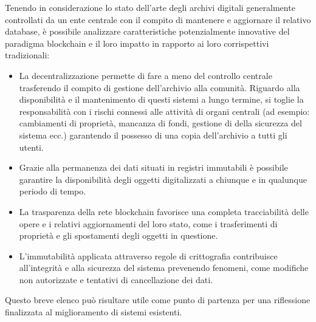 Tenendo in considerazione lo stato dell'arte degli archivi digitali generalmente controllati da un ente centrale con il compito di mantenere e aggiornare il relativo database, è possibile analizzare caratteristiche potenzialmente innovative del paradigma blockchain e il loro impatto in rapporto ai loro corrispettivi tradizionali:

\begin{itemize}
\item La decentralizzazione permette di fare a meno del controllo centrale trasferendo il compito di gestione dell’archivio alla comunità. Riguardo alla disponibilità e il mantenimento di questi sistemi a lungo termine, si toglie la responsabilità con i rischi connessi alle attività di organi centrali (ad esempio: cambiamenti di proprietà, mancanza di fondi, gestione di della sicurezza del sistema ecc.) garantendo il possesso di una copia dell’archivio a tutti gli utenti. 
\item Grazie alla permanenza dei dati situati in registri immutabili è possibile garantire la disponibilità degli oggetti digitalizzati a chiunque e in qualunque periodo di tempo. 
\item La trasparenza della rete blockchain favorisce una completa tracciabilità delle opere e i relativi aggiornamenti del loro stato, come i trasferimenti di proprietà e gli spostamenti degli oggetti in questione.
\item L'immutabilità applicata attraverso regole di crittografia contribuisce all’integrità e alla sicurezza del sistema prevenendo fenomeni, come modifiche non autorizzate e tentativi di cancellazione dei dati.
\end{itemize}

Questo breve elenco può risultare utile come punto di partenza per una riflessione finalizzata al miglioramento di sistemi esistenti.